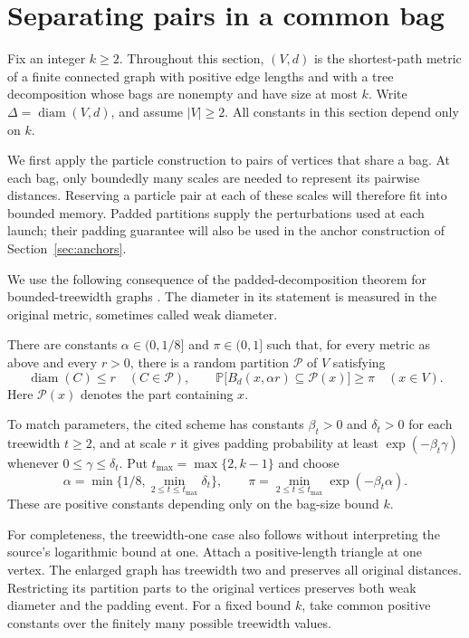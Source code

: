 \section{Separating pairs in a common bag}
\label{sec:perturbations}

Fix an integer $k\geq 2$. Throughout this section, $(V,d)$ is the
shortest-path metric of a finite connected graph with positive edge lengths
and with a tree decomposition whose bags are nonempty and have size at most $k$. Write
$\Delta=\operatorname{diam}(V,d)$, and assume $|V|\geq 2$.
All constants in this section depend only on $k$.

We first apply the particle construction to pairs of vertices that share
a bag. At each bag, only boundedly many scales are needed to represent
its pairwise distances. Reserving a particle pair at each of these scales
will therefore fit into bounded memory. Padded partitions supply the
perturbations used at each launch; their padding guarantee will also be
used in the anchor construction of Section~\ref{sec:anchors}.

We use the following consequence of the padded-decomposition theorem for
bounded-treewidth graphs \cite[Theorem~1.2 and Definition~2.1]{FiltserEtAl}.
The diameter in its statement is
measured in the original metric, sometimes called weak diameter.

\begin{theorem}\label{thm:padded}
There are constants $\alpha\in(0,1/8]$ and $\pi\in(0,1]$ such that, for
every metric as above and every $r>0$, there is a random partition
$\mathcal P$ of $V$ satisfying
\[
  \operatorname{diam}(C)\leq r\quad(C\in\mathcal P),
  \qquad
  \mathbb P\bigl[B_d(x,\alpha r)\subseteq\mathcal P(x)\bigr]\geq\pi
  \quad(x\in V).
\]
Here $\mathcal P(x)$ denotes the part containing $x$.
\end{theorem}

To match parameters, the cited scheme has constants $\beta_t>0$ and
$\delta_t>0$ for each treewidth $t\geq2$, and at scale $r$ it gives
padding probability at least $\exp(-\beta_t\gamma)$ whenever
$0\leq\gamma\leq\delta_t$.  Put $t_{\max}=\max\{2,k-1\}$ and choose
\[
 \alpha=\min\bigl\{1/8,\min_{2\leq t\leq t_{\max}}\delta_t\bigr\},
 \qquad
 \pi=\min_{2\leq t\leq t_{\max}}\exp(-\beta_t\alpha).
\]
These are positive constants depending only on the bag-size bound $k$.

For completeness, the treewidth-one case also follows without interpreting
the source's logarithmic bound at one. Attach a positive-length triangle
at one vertex. The enlarged graph has treewidth two and preserves all
original distances. Restricting its partition parts to the original
vertices preserves both weak diameter and the padding event. For a fixed
bound $k$, take common positive constants over the finitely many possible
treewidth values.

